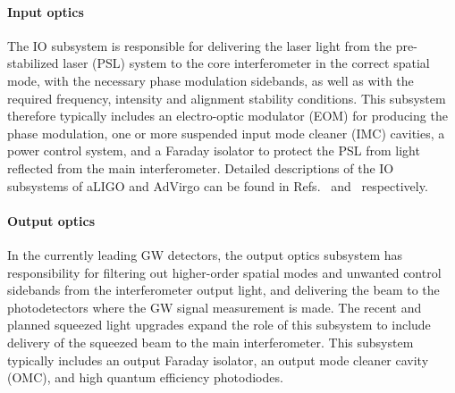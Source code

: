 \paragraph{\bf Input optics}
The IO subsystem is responsible for delivering the laser light from the pre-stabilized laser (PSL) system to the core interferometer in the correct spatial mode, with the necessary phase modulation sidebands, as well as with the required frequency, intensity and alignment stability conditions. This subsystem therefore typically includes an electro-optic modulator (EOM) for producing the phase modulation, one or more suspended input mode cleaner (IMC) cavities, a power control system, and a Faraday isolator to protect the PSL from light reflected from the main interferometer. Detailed descriptions of the IO subsystems of aLIGO and AdVirgo can be found in Refs.~\cite{aLIGO_IO} and~\cite{IOchapter} respectively. 
\paragraph{\bf Output optics}
In the currently leading GW detectors, the output optics subsystem has responsibility for filtering out higher-order spatial modes and unwanted control sidebands from the interferometer output light, and delivering the beam to the photodetectors where the GW signal measurement is made. The recent and planned squeezed light upgrades expand the role of this subsystem to include delivery of the squeezed beam to the main interferometer. This subsystem typically includes an output Faraday isolator, an output mode cleaner cavity (OMC), and high quantum efficiency photodiodes.
